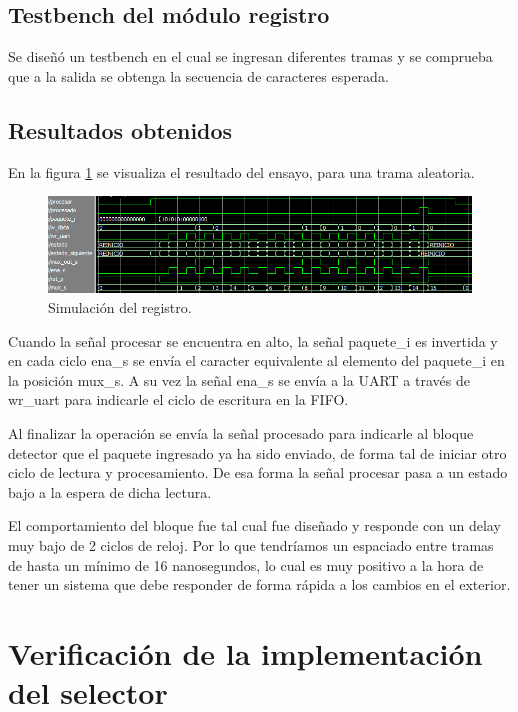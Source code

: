 	\subsection{Testbench del módulo registro}
			
		Se diseñó un testbench en el cual se ingresan diferentes tramas y se comprueba que a la salida se obtenga la secuencia de caracteres esperada.		
			
	\subsection{Resultados obtenidos}
				
		En la figura \ref{fig:Test_Registro} se visualiza el resultado del ensayo, para una trama aleatoria.
		
	\begin{figure}[h]
	\centering
	\includegraphics[scale=0.6]{./Figures/Test/Registro}
		\caption{Simulación del registro.}
		\label{fig:Test_Registro}
	\end{figure}
	
	Cuando la señal procesar se encuentra en alto, la señal paquete\_i es invertida y en cada ciclo ena\_s se envía el caracter equivalente al elemento del paquete\_i en la posición mux\_s. A su vez la señal ena\_s se envía a la UART a través de wr\_uart para indicarle el ciclo de escritura en la FIFO.
	
	Al finalizar la operación se envía la señal procesado para indicarle al bloque detector que el paquete ingresado ya ha sido enviado, de forma tal de iniciar otro ciclo de lectura y procesamiento. De esa forma la señal procesar pasa a un estado bajo a la espera de dicha lectura.
	
	El comportamiento del bloque fue tal cual fue diseñado y responde con un delay muy bajo de 2 ciclos de reloj. Por lo que tendríamos un espaciado entre tramas de hasta un mínimo de 16 nanosegundos, lo cual es muy positivo a la hora de tener un sistema que debe responder de forma rápida a los cambios en el exterior.	
	
\section{Verificación de la implementación del selector}

